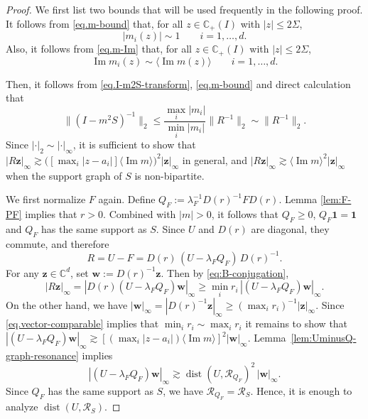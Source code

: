 \documentclass[11pt,twoside, a4paper]{article}
\numberwithin{equation}{section}
\numberwithin{figure}{section}
\theoremstyle{plain} %
\theoremstyle{definition}
\theoremstyle{remark}
\newcommand{\1} {\mspace{1 mu}}
\newcommand{\2} {\mspace{2 mu}}
\newcommand{\C} {{\mathbb{C}}}
\newcommand{\Cp} {\mathbb {C}_+}
\DeclareMathOperator{\im}{Im}
\DeclareMathOperator{\dist}{dist}
\begin{document}
\begin{proof}
We first list two bounds that will be used frequently in the following proof. It follows from \eqref{eq.m-bound} that, for all $z\in\Cp(I)$ with $|z|\le 2\Sigma$,
    \begin{equation}\label{eq.m-bulk-bound-symmetric}
      |m_{i}(z)|\sim 1\qquad i=1,\dots,d.
    \end{equation}
    Also, it follows from \eqref{eq.m-Im} that, for all $z\in \Cp(I)$ with $|z|\le 2\Sigma$,
    \begin{equation}\label{eq.im-m-comparability-symmetric}
      \im m_{i}(z)\sim\langle \im m(z)\rangle\qquad i=1,\dots,d.
    \end{equation}

    Then, it follows from \eqref{eq.I-m2S-transform}, \eqref{eq.m-bound} and direct calculation that
    \[
      \|(I-m^2S)^{-1}\|_2\le\frac{\max_i|m_i|}{\min_i|m_i|}\|R^{-1}\|_2\sim\|R^{-1}\|_2.
    \]
    Since $|\cdot|_2\sim|\cdot|_\infty$, it is sufficient to show that
    $
    |R\mathbf z|_\infty
    \gtrsim
    \bigl([\max_i |z-a_i|]\langle\im m\rangle\bigr)^2
    |\mathbf z|_\infty$
    in general, and
    $
    |R\mathbf z|_\infty
    \gtrsim
    \langle\im m\rangle^2|\mathbf z|_\infty
    $
    when the support graph of \(S\) is non-bipartite.
    

    We first normalize $F$ again. Define $ Q_F:= \lambda_F^{-1}D(r)^{-1}FD(r)$.
    Lemma \ref{lem:F-PF} implies that $r>0$. Combined with $|m|>0$, it follows that $Q_F\ge0$, $Q_F\mathbf{1}=\mathbf{1}$ and $Q_F$ has the same support as $S$.
    Since \(U\) and \(D(r)\) are diagonal, they commute, and therefore
    \begin{equation}\label{eq:B-conjugation}
    R
    =
    U-F
    =
    D(r)\,(U-\lambda_F Q_F)\,D(r)^{-1}.
    \end{equation}
    For any \(\mathbf z\in\C^d\), set
    $
    \mathbf w:=D(r)^{-1}\mathbf z.
    $
    Then by \eqref{eq:B-conjugation},
    \begin{equation}\label{eq:B-vs-UQ-1}
      |R\mathbf z|_\infty=|D(r)(U-\lambda_FQ_F)\mathbf w|_\infty\ge \min_i r_i\, |(U-\lambda_FQ_F)\mathbf w|_\infty.
    \end{equation}
    On the other hand, we have
    $
    |\mathbf w|_\infty=|D(r)^{-1}\mathbf z|_\infty\ge
    (\max_i r_i)^{-1}|\mathbf z|_\infty.
    $
    Since \eqref{eq.vector-comparable} implies that $\min_i r_i\sim\max_i r_i$ it remains to show that
    $
    |(U-\lambda_FQ_F)\mathbf w|_\infty\gtrsim[(\max_i |z-a_i|)\langle\im m\rangle]^{2}|\mathbf w|_\infty .
    $
    Lemma~\ref{lem:UminusQ-graph-resonance} implies 
    \begin{equation}\label{eq.s1-U-F-symmetry}
        |(U-\lambda_FQ_F)\mathbf w|_\infty
    \gtrsim\dist(U,\mathscr{R}_{Q_F})^2\,|\mathbf w|_\infty .
    \end{equation}
    Since $Q_F$ has the same support as $S$, we have
    $
    \mathscr{R}_{Q_F} = \mathscr{R}_S.
    $
    Hence, it is enough to analyze $\dist(U,\mathscr{R}_{S})$.



\end{proof}
\end{document}
